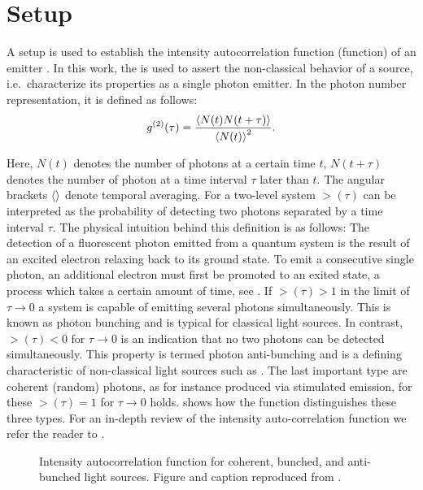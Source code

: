 	\section{\HBT Setup}\label{sec::methods_hbt}

		A \HBT setup is used to establish the intensity autocorrelation function (\gt function) of an emitter \cite{brown1956correlation, brown1956test}.
		In this work, the \gtf is used to assert the non-classical behavior of a \pl source, i.e.\ characterize its properties as a single photon emitter.
		In the photon number representation, it is defined as follows:
		\begin{equation}
		g^{(2)}(\tau) = \frac{ \left\langle  N(t) N(t+\tau) \right\rangle }{\left\langle N(t)\right\rangle^2}.
		\end{equation}

		Here, $N(t)$ denotes the number of photons at a certain time $t$, $N(t+\tau)$ denotes the number of photon at a time interval $\tau$ later than $t$.
		The angular brackets $\left\langle \right\rangle$ denote temporal averaging.
		For a two-level system $\gt(\tau)$ can be interpreted as the probability of detecting two photons separated by a time interval $\tau$.
		The physical intuition behind this definition is as follows: The detection of a fluorescent photon emitted from a quantum system is the result of an excited electron relaxing back to its ground state. To emit a consecutive single photon, an additional electron must first be promoted to an exited state, a process which takes a certain amount of time, see . If $\gt(\tau) > 1$ in the limit of $\tau \to 0$ a system is capable of emitting several photons simultaneously. This is known as photon bunching and is typical for classical light sources. In contrast, $\gt(\tau) < 0$ for $\tau \to 0$ is an indication that no two photons can be detected simultaneously. This property is termed photon anti-bunching and is a defining characteristic of non-classical light sources such as \sps. The last important type are coherent (random) photons, as for instance produced via stimulated emission, for these  $\gt(\tau) = 1$ for $\tau \to 0$ holds.  shows how the \gt function distinguishes these three types. For an in-depth review of the intensity auto-correlation function we refer the reader to \cite{Neu2012, Fox2006}.

		\begin{figure}[!htb]
			\centering
			\caption[Sketch of typical \gt functions]{Intensity autocorrelation function for coherent, bunched, and anti-bunched light sources. Figure and caption reproduced from \cite{rahbany2016towards}.}
			\label{fig::g2_illustration}
		\end{figure}

